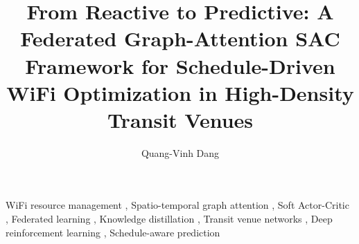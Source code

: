 \documentclass[review,12pt]{elsarticle}
\begin{document}
\begin{frontmatter}

\title{From Reactive to Predictive: A Federated Graph-Attention SAC Framework for Schedule-Driven WiFi Optimization in High-Density Transit Venues}

\author[a]{Quang-Vinh Dang}




\begin{keyword}
WiFi resource management \sep
Spatio-temporal graph attention \sep
Soft Actor-Critic \sep
Federated learning \sep
Knowledge distillation \sep
Transit venue networks \sep
Deep reinforcement learning \sep
Schedule-aware prediction
\end{keyword}

\end{frontmatter}









\end{document}
